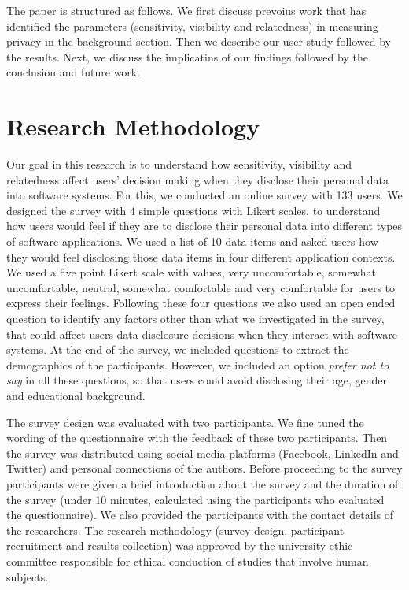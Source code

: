 \documentclass[conference]{IEEEtran}
\begin{document}
The paper is structured as follows. We first discuss prevoius work that has identified the parameters (sensitivity, visibility and relatedness) in measuring privacy in the background section. Then we describe our user study followed by the results. Next, we discuss the implicatins of our findings followed by the conclusion and future work.


\section {Research Methodology}

Our goal in this research is to understand how sensitivity, visibility and relatedness affect users' decision making when they disclose their personal data into software systems. For this, we conducted an online survey with 133 users. We designed the survey with 4 simple questions with Likert scales, to understand how users would feel if they are to disclose their personal data into different types of software applications. We used a list of 10 data items and asked users how they would feel disclosing those data items in four different application contexts. We used a five point Likert scale with values, very uncomfortable, somewhat uncomfortable, neutral, somewhat comfortable and very comfortable for users to express their feelings. Following these four questions we also used an open ended question to identify any factors other than what we investigated in the survey, that could affect users data disclosure decisions when they interact with software systems. At the end of the survey, we included questions to extract the demographics of the participants. However, we included an option \textit{prefer not to say} in all these questions, so that users could avoid disclosing their age, gender and educational background.

The survey design was evaluated with two participants. We fine tuned the wording of the questionnaire with the feedback of these two participants. Then the survey was distributed using social media platforms (Facebook, LinkedIn and Twitter) and personal connections of the authors. Before proceeding to the survey participants were given a brief introduction about the survey and the duration of the survey (under 10 minutes, calculated using the participants who evaluated the questionnaire). We also provided the participants with the contact details of the researchers. The research methodology (survey design, participant recruitment and results collection) was approved by the university ethic committee responsible for ethical conduction of studies that involve human subjects.
\end{document}
